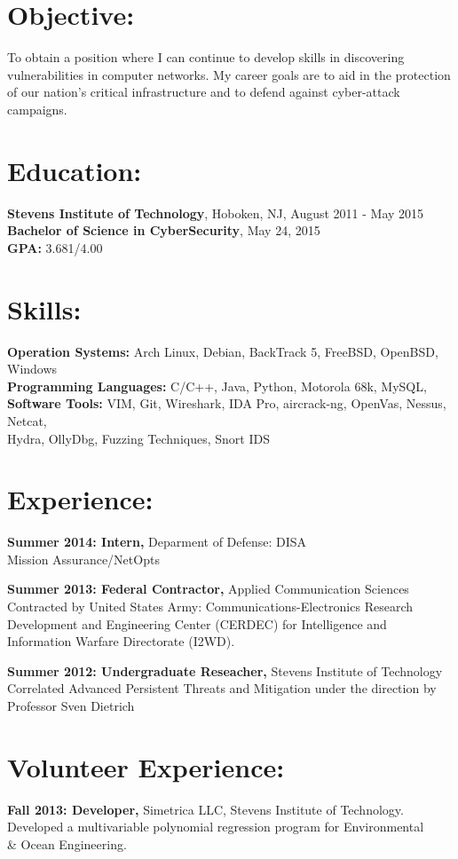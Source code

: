 \documentclass[mm]{res}
\begin{document}
\begin{resume} 
 
\section{Objective:} 
To obtain a position where I can continue to develop skills in discovering  vulnerabilities in computer networks. My career goals are to aid in the protection of our nation's critical infrastructure and to defend against cyber-attack campaigns.

\section{Education:}
{\bf Stevens Institute of Technology}, Hoboken, NJ, August 2011 - May 2015 \\
{\bf Bachelor of Science in CyberSecurity}, May 24, 2015 \\ 
{\bf GPA:} 3.681/4.00

\section{Skills:}
{\bf Operation Systems:} Arch Linux, Debian, BackTrack 5, FreeBSD, OpenBSD, Windows \\
{\bf Programming Languages:} C/C++, Java, Python, Motorola 68k, MySQL,\\
{\bf Software Tools:} VIM, Git, Wireshark, IDA Pro, aircrack-ng, OpenVas, Nessus, Netcat, \\ 
Hydra, OllyDbg, Fuzzing Techniques, Snort IDS 

\section{Experience:}
 {\bf Summer 2014: Intern,} Deparment of Defense: DISA \\
 Mission Assurance/NetOpts
  
 {\bf Summer 2013: Federal Contractor,} Applied Communication Sciences  
 Contracted by United States Army: Communications-Electronics Research Development and Engineering Center (CERDEC) for Intelligence and Information Warfare Directorate (I2WD).
 
{\bf Summer 2012: Undergraduate Reseacher,} Stevens Institute of Technology \\
Correlated Advanced Persistent Threats and Mitigation under the direction by Professor Sven Dietrich

\section{Volunteer Experience:} 
            {\bf Fall 2013: Developer,} Simetrica LLC, Stevens Institute of Technology.\\       
  Developed a multivariable polynomial regression program for Environmental \\ \& Ocean Engineering.
                

\end{resume}
\end{document}
